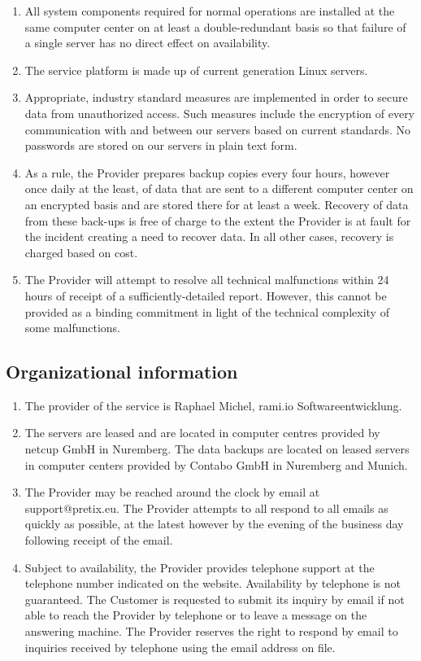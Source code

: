 \documentclass{terms}
\begin{document}
\begin{enumerate}
\item All system components required for normal operations are installed at the same computer center on at least a double-redundant basis so that failure of a single server has no direct effect on availability.
\item The service platform is made up of current generation Linux servers.
\item Appropriate, industry standard measures are implemented in order to secure data from unauthorized access. Such measures include the encryption of every communication with and between our servers based on current standards. No passwords are stored on our servers in plain text form.
\item As a rule, the Provider prepares backup copies every four hours, however once daily at the least, of data that are sent to a different computer center on an encrypted basis and are stored there for at least a week. Recovery of data from these back-ups is free of charge to the extent the Provider is at fault for the incident creating a need to recover data. In all other cases, recovery is charged based on cost.
\item The Provider will attempt to resolve all technical malfunctions within 24 hours of receipt of a sufficiently-detailed report. However, this cannot be provided as a binding commitment in light of the technical complexity of some malfunctions.
\end{enumerate}
\subsection{Organizational information}
\begin{enumerate}
\item The provider of the service is Raphael Michel, rami.io Softwareentwicklung.
\item The servers are leased and are located in computer centres provided by netcup GmbH in Nuremberg. The data backups are located on leased servers in computer centers provided by Contabo GmbH in Nuremberg and Munich.
\item The Provider may be reached around the clock by email at support@pretix.eu. The Provider attempts to all respond to all emails as quickly as possible, at the latest however by the evening of the business day following receipt of the email.
\item Subject to availability, the Provider provides telephone support at the telephone number indicated on the website. Availability by telephone is not guaranteed. The Customer is requested to submit its inquiry by email if not able to reach the Provider by telephone or to leave a message on the answering machine. The Provider reserves the right to respond by email to inquiries received by telephone using the email address on file.
\end{enumerate}
\end{document}
